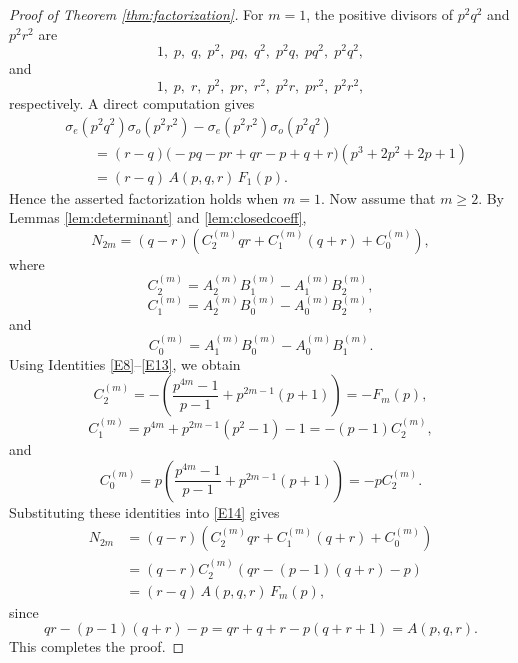 \documentclass[10pt,a4paper]{amsart}
\begin{document}
\begin{proof}[Proof of Theorem \ref{thm:factorization}]
For \(m=1\), the positive divisors of \(p^2q^2\) and \(p^2r^2\) are
\[
1,\; p,\; q,\; p^2,\; pq,\; q^2,\; p^2q,\; pq^2,\; p^2q^2,
\]
and
\[
1,\; p,\; r,\; p^2,\; pr,\; r^2,\; p^2r,\; pr^2,\; p^2r^2,
\]
respectively. A direct computation gives
\[
\begin{aligned}
&\sigma_e(p^{2}q^2)\sigma_o(p^{2}r^2)
-\sigma_e(p^{2}r^2)\sigma_o(p^{2}q^2) \\
&\qquad
=(r-q)\bigl(-pq-pr+qr-p+q+r\bigr)
\left(p^3+2p^2+2p+1\right) \\
&\qquad
=(r-q)\,A(p,q,r)\,F_1(p).
\end{aligned}
\]
Hence the asserted factorization holds when \(m=1\).
Now assume that \(m\ge2\). By Lemmas \ref{lem:determinant} and \ref{lem:closedcoeff},
\begin{equation}\label{E14}
N_{2m}
=
(q-r)
\left(
C_2^{(m)}qr
+
C_1^{(m)}(q+r)
+
C_0^{(m)}
\right),
\end{equation}
where
\[
C_2^{(m)}=A_2^{(m)}B_1^{(m)}-A_1^{(m)}B_2^{(m)},
\]
\[
C_1^{(m)}=A_2^{(m)}B_0^{(m)}-A_0^{(m)}B_2^{(m)},
\]
and
\[
C_0^{(m)}=A_1^{(m)}B_0^{(m)}-A_0^{(m)}B_1^{(m)}.
\]
Using Identities \eqref{E8}--\eqref{E13}, we obtain
\[
C_2^{(m)}
=
-
\left(
\frac{p^{4m}-1}{p-1}
+
p^{2m-1}(p+1)
\right)
=-F_m(p),
\]
\[
C_1^{(m)}
=
p^{4m}+p^{2m-1}(p^2-1)-1
=-(p-1)C_2^{(m)},
\]
and
\[
C_0^{(m)}
=
p
\left(
\frac{p^{4m}-1}{p-1}
+
p^{2m-1}(p+1)
\right)
=-pC_2^{(m)}.
\]
Substituting these identities into \eqref{E14} gives
\[
\begin{aligned}
N_{2m}
&=(q-r)
\left(
C_2^{(m)}qr
+C_1^{(m)}(q+r)
+C_0^{(m)}
\right) \\
&=(q-r)C_2^{(m)}
\left(
qr-(p-1)(q+r)-p
\right) \\
&=(r-q)\,
A(p,q,r)\,
F_m(p),
\end{aligned}
\]
since
\[
qr-(p-1)(q+r)-p
=
qr+q+r-p(q+r+1)
=
A(p,q,r).
\]
This completes the proof.
\end{proof}
\end{document}
